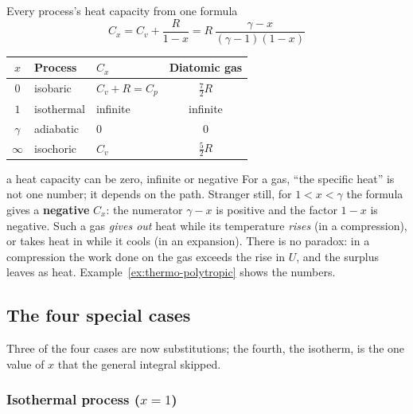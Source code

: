 \begin{keybox}{Every process's heat capacity from one formula}\label{key:polyC}
\[
C_x=C_v+\frac{R}{1-x}=R\,\frac{\gamma-x}{(\gamma-1)(1-x)}
\]
\begin{center}
\begin{tabular}{@{}cllc@{}}
\toprule
$x$ & Process & $C_x$ & Diatomic gas\\
\midrule
$0$ & isobaric & $C_v+R=C_p$ & $\tfrac72R$\\
$1$ & isothermal & infinite & infinite\\
$\gamma$ & adiabatic & $0$ & $0$\\
$\infty$ & isochoric & $C_v$ & $\tfrac52R$\\
\bottomrule
\end{tabular}
\end{center}
\end{keybox}


\begin{trapbox}{a heat capacity can be zero, infinite or negative}
For a gas, ``the specific heat'' is not one number; it depends on the path. Stranger still, for
$1<x<\gamma$ the formula gives a \textbf{negative} $C_x$: the numerator $\gamma-x$ is positive and the
factor $1-x$ is negative. Such a gas \emph{gives out} heat while its temperature \emph{rises} (in a
compression), or takes heat in while it cools (in an expansion). There is no paradox: in a compression the
work done on the gas exceeds the rise in $U$, and the surplus leaves as heat.
Example~\ref{ex:thermo-polytropic} shows the numbers.
\end{trapbox}

\subsection{The four special cases}

Three of the four cases are now substitutions; the fourth, the isotherm, is the one value of $x$ that the
general integral skipped.

\subsubsection{Isothermal process (\texorpdfstring{$x=1$}{x = 1})}\label{sec:isothermal}

